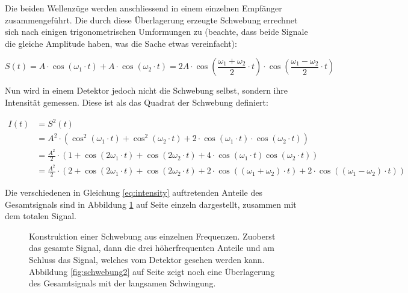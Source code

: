 Die beiden  Wellenz\"uge werden  anschliessend in einem  einzelnen Empf\"anger
zusammengef\"uhrt. Die durch diese \"Uberlagerung erzeugte Schwebung errechnet
sich  nach  einigen  trigonometrischen  Umformungen zu  (beachte,  dass  beide
Signale die gleiche Amplitude haben, was die Sache etwas vereinfacht):

\begin{equation}
    \label{eq:schwebung}
    S(t) = A \cdot \cos(\omega_1 \cdot t) + A \cdot \cos(\omega_2 \cdot t)
         = 2 A \cdot
             \cos\left(
                 \frac{\omega_1 + \omega_2}{2} \cdot t
             \right)
             \cdot
             \cos\left(
                 \frac{\omega_1 - \omega_2}{2} \cdot t
             \right)
\end{equation}

Nun wird  in einem Detektor  jedoch nicht  die Schwebung selbst,  sondern ihre
Intensit\"at gemessen. Diese ist als das Quadrat der Schwebung definiert:

\begin{equation}
    \label{eq:intensity}
    \begin{split}
        I(t) &= S^2(t) \\
             &= A^2           \cdot \left( \cos^2(\omega_1 \cdot t) + \cos^2(\omega_2 \cdot t) + 2 \cdot \cos(\omega_1 \cdot t) \cdot \cos(\omega_2 \cdot t) \right) \\
             &= \frac{A^2}{2} \cdot \left( 1 + \cos(2\omega_1 \cdot t) + \cos(2\omega_2 \cdot t) + 4 \cdot \cos(\omega_1 \cdot t)\cos(\omega_2 \cdot t) \right) \\
             &= \frac{A^2}{2} \cdot \left( 2 + \cos(2\omega_1 \cdot t) + \cos(2\omega_2 \cdot t) + 2 \cdot \cos\left((\omega_1 + \omega_2) \cdot t \right) + 2 \cdot \cos\left( (\omega_1 - \omega_2) \cdot t \right) \right)
    \end{split}
\end{equation}

Die  verschiedenen   in  Gleichung  \ref{eq:intensity}   auftretenden  Anteile
des   Gesamtsignals   sind   in  Abbildung   \ref{fig:schwebung}   auf   Seite
\pageref{fig:schwebung} einzeln dargestellt, zusammen mit dem totalen Signal.

\begin{figure}[h!t]
    \centering
    \resizebox{0.6\textwidth}{!}{}
    \caption{%
        Konstruktion  einer Schwebung  aus einzelnen  Frequenzen. Zuoberst das
        gesamte Signal, dann die drei h\"oherfrequenten Anteile und am Schluss
        das  Signal,  welches  vom  Detektor  gesehen  werden  kann. Abbildung
        \ref{fig:schwebung2}  auf  Seite \pageref{fig:schwebung2}  zeigt  noch
        eine \"Uberlagerung des Gesamtsignals mit der langsamen Schwingung.
    }
    \label{fig:schwebung}
\end{figure}

